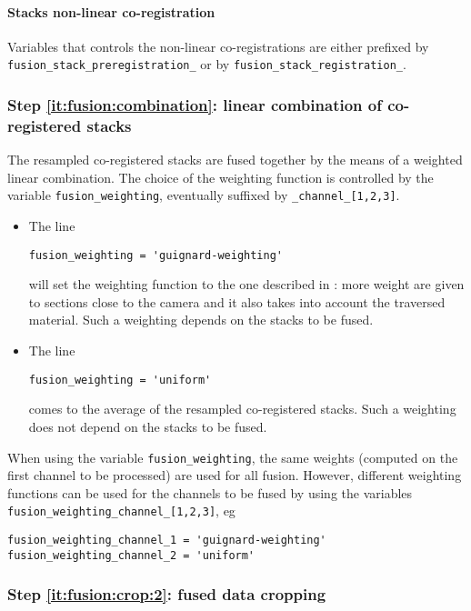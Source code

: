 \paragraph{Stacks non-linear co-registration}

Variables that controls the non-linear co-registrations are either prefixed by \texttt{fusion\_stack\_preregistration\_} or by \texttt{fusion\_stack\_registration\_}.

\subsubsection{Step \ref{it:fusion:combination}: linear combination of co-registered stacks}

The resampled co-registered stacks are fused together by the means of a weighted linear combination.  The choice of the weighting function is controlled by the variable \texttt{fusion\_weighting}, eventually suffixed by \texttt{\_channel\_[1,2,3]}.

\begin{itemize}
\item The line
\begin{verbatim}
fusion_weighting = 'guignard-weighting'
\end{verbatim}
will set the weighting function to the one described in \cite{guignard:tel-01278725}: more weight are given to sections close to the camera and it also takes into account the traversed material. Such a weighting depends on the stacks to be fused.
\item The line
\begin{verbatim}
fusion_weighting = 'uniform'
\end{verbatim}
comes to the average of the resampled co-registered stacks. Such a weighting does not depend on the stacks to be fused.
\end{itemize}


When using the variable \texttt{fusion\_weighting}, the same weights (computed on the first channel to be processed) are used for all fusion. However, different weighting functions can be used for the channels to be fused by using the variables  \texttt{fusion\_weighting\_channel\_[1,2,3]}, eg
\begin{verbatim}
fusion_weighting_channel_1 = 'guignard-weighting'
fusion_weighting_channel_2 = 'uniform'
\end{verbatim}


\subsubsection{Step \ref{it:fusion:crop:2}: fused data cropping}
\label{sec:cli:fuse:fused:data:cropping}


